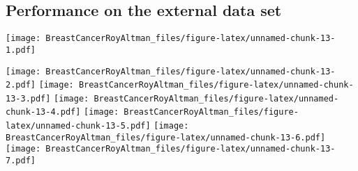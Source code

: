 \documentclass[
]{article}
\newenvironment{Shaded}{\begin{snugshade}}{\end{snugshade}}
\newcommand{\AttributeTok}[1]{\textcolor[rgb]{0.77,0.63,0.00}{#1}}
\newcommand{\FloatTok}[1]{\textcolor[rgb]{0.00,0.00,0.81}{#1}}
\newcommand{\FunctionTok}[1]{\textcolor[rgb]{0.00,0.00,0.00}{#1}}
\newcommand{\NormalTok}[1]{#1}
\newcommand{\OtherTok}[1]{\textcolor[rgb]{0.56,0.35,0.01}{#1}}
\newcommand{\SpecialCharTok}[1]{\textcolor[rgb]{0.00,0.00,0.00}{#1}}
\newcommand{\StringTok}[1]{\textcolor[rgb]{0.31,0.60,0.02}{#1}}
\begin{document}
\hypertarget{performance-on-the-external-data-set}{%
\subsection{Performance on the external data
set}\label{performance-on-the-external-data-set}}

\begin{Shaded}
\end{Shaded}

\texttt{[image: BreastCancerRoyAltman\_files/figure-latex/unnamed-chunk-13-1.pdf]}

\begin{Shaded}
\end{Shaded}

\texttt{[image: BreastCancerRoyAltman\_files/figure-latex/unnamed-chunk-13-2.pdf]}
\texttt{[image: BreastCancerRoyAltman\_files/figure-latex/unnamed-chunk-13-3.pdf]}
\texttt{[image: BreastCancerRoyAltman\_files/figure-latex/unnamed-chunk-13-4.pdf]}
\texttt{[image: BreastCancerRoyAltman\_files/figure-latex/unnamed-chunk-13-5.pdf]}
\texttt{[image: BreastCancerRoyAltman\_files/figure-latex/unnamed-chunk-13-6.pdf]}
\texttt{[image: BreastCancerRoyAltman\_files/figure-latex/unnamed-chunk-13-7.pdf]}
\end{document}
